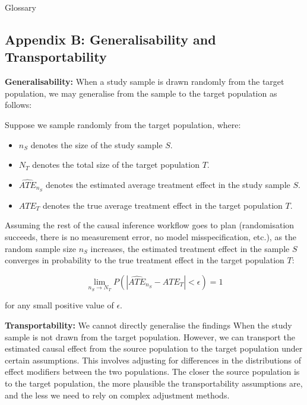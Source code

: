 \documentclass[
  single column]{article}
\providecommand{\tightlist}{%
  \setlength{\itemsep}{0pt}\setlength{\parskip}{0pt}}\usepackage{longtable,booktabs,array}
\begin{document}
\begin{table}

\caption{\label{tbl-experiments}Glossary}

\centering{

\glossaryTerms

}

\end{table}%

\newpage{}

\subsection{Appendix B: Generalisability and
Transportability}\label{id-app-b}

\textbf{Generalisability:} When a study sample is drawn randomly from
the target population, we may generalise from the sample to the target
population as follows:

Suppose we sample randomly from the target population, where:

\begin{itemize}
\tightlist
\item
  \(n_S\) denotes the size of the study sample \(S\).
\item
  \(N_T\) denotes the total size of the target population \(T\).
\item
  \(\widehat{ATE}_{n_S}\) denotes the estimated average treatment effect
  in the study sample \(S\).
\item
  \(ATE_{T}\) denotes the true average treatment effect in the target
  population \(T\).
\end{itemize}

Assuming the rest of the causal inference workflow goes to plan
(randomisation succeeds, there is no measurement error, no model
misspecification, etc.), as the random sample size \(n_S\) increases,
the estimated treatment effect in the sample \(S\) converges in
probability to the true treatment effect in the target population \(T\):

\[
\lim_{n_S \to N_T} P(|\widehat{ATE}_{n_S} - ATE_{T}| < \epsilon) = 1
\]

for any small positive value of \(\epsilon\).

\textbf{Transportability:} We cannot directly generalise the findings
When the study sample is not drawn from the target population. However,
we can transport the estimated causal effect from the source population
to the target population under certain assumptions. This involves
adjusting for differences in the distributions of effect modifiers
between the two populations. The closer the source population is to the
target population, the more plausible the transportability assumptions
are, and the less we need to rely on complex adjustment methods.
\end{document}

